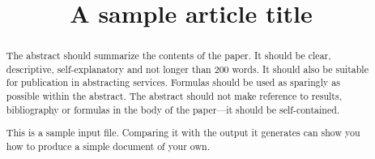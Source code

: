 \documentclass[ps]{imsart}
\theoremstyle{plain}
\theoremstyle{definition}
\theoremstyle{remark}
\begin{document}
\begin{frontmatter}
\title{A sample article title}


\begin{abstract}
The abstract should summarize the contents of the paper.
It should be clear, descriptive, self-explanatory and not longer
than 200 words. It should also be suitable for publication in
abstracting services. Formulas should be used as sparingly as
possible within the abstract. The abstract should not make
reference to results, bibliography or formulas in the body
of the paper---it should be self-contained.

This is a sample input file.  Comparing it with the output it
generates can show you how to produce a simple document of
your own.
\end{abstract}

\begin{keyword}[class=MSC]
\end{keyword}

\begin{keyword}
\end{keyword}

\end{frontmatter}
\end{document}
